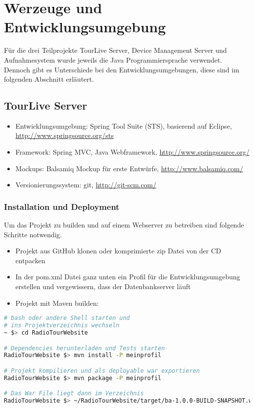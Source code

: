 \section{Werzeuge und Entwicklungsumgebung}
\label{sec:wekzeugeundentwicklungsumgebung}
Für die drei Teilprojekte TourLive Server, Device Management Server und Aufnahmesystem wurde jeweils die Java Programmiersprache verwendet. Dennoch gibt es Unterschiede bei den Entwicklungsumgebungen, diese sind im folgenden Abschnitt erläutert.

\subsection{TourLive Server}
\begin{itemize}
\item Entwicklungsumgebung: Spring Tool Suite (STS), basierend auf Eclipse, \url{http://www.springsource.org/sts}
\item Framework: Spring MVC, Java Webframework, \url{http://www.springsource.org/}
\item Mockups: Balsamiq Mockup für erste Entwürfe, \url{http://www.balsamiq.com/}
\item Versionierungssystem: git, \url{http://git-scm.com/}
\end{itemize}

\subsubsection{Installation und Deployment}
Um das Projekt zu builden und auf einem Webserver zu betreiben sind folgende Schritte notwendig.

\begin{itemize}
\item Projekt aus GitHub klonen oder komprimierte zip Datei von der CD entpacken
\item In der pom.xml Datei ganz unten ein Profil für die Entwicklungsumgebung erstellen und vergewissern, dass der Datenbankserver läuft
\item Projekt mit Maven builden:
\end{itemize}

\begin{lstlisting}[language=Bash, caption=Build und Test mit Maven]
# bash oder andere Shell starten und
# ins Projektverzeichnis wechseln
~ $> cd RadioTourWebsite

# Dependencies herunterladen und Tests starten
RadioTourWebsite $> mvn install -P meinprofil

# Projekt kompilieren und als deployable war exportieren
RadioTourWebsite $> mvn package -P meinprofil

# Das War File liegt dann im Verzeichnis
RadioTourWebsite $> ~/RadioTourWebsite/target/ba-1.0.0-BUILD-SNAPSHOT.war

\end{lstlisting}

